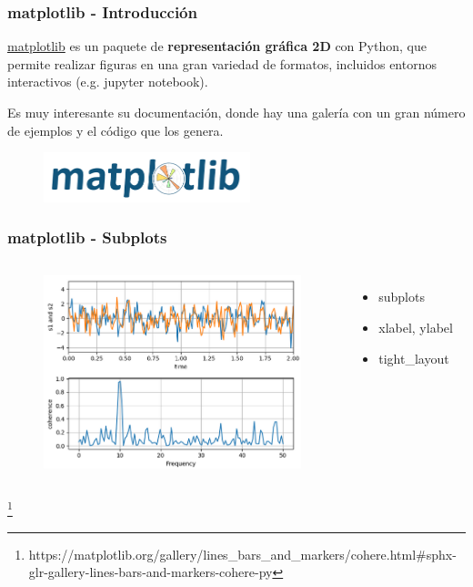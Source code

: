 \documentclass[18pt]{beamer}
\newcommand\blfootnote[1]{%
  \begingroup
  \renewcommand\thefootnote{}\footnote{#1}%
  \addtocounter{footnote}{-1}%
  \endgroup
}
\begin{document}
\begin{frame}

	\frametitle{matplotlib - Introducción}

	\href{https://matplotlib.org/}{matplotlib}
	es un paquete de \textbf{representación gráfica 2D} con Python, que 
	permite realizar figuras en una gran variedad de formatos, 
	incluidos entornos interactivos (e.g. jupyter notebook). 
	
	Es muy interesante su documentación, donde hay una galería con un 
	gran número de ejemplos y el código que los genera.
	
	\vspace{0.4cm}
	
	\begin{figure}
		\includegraphics[width=6.0cm]{images/matplotlib.png}
	\end{figure}

\end{frame}


\begin{frame}
	
	\frametitle{matplotlib - Subplots}

	\begin{columns}

			
		\begin{figure}
			\includegraphics[width=7.5cm]{images/matplotlib_subplots.png}
		\end{figure}
	
			\begin{itemize}
				\item subplots
				\item xlabel, ylabel
				\item tight\_layout
			\end{itemize}
		
	\end{columns}
	
	\blfootnote{\scriptsize https://matplotlib.org/gallery/lines\_bars\_and\_markers/cohere.html\#sphx-glr-gallery-lines-bars-and-markers-cohere-py}
	
	
\end{frame}
\end{document}
